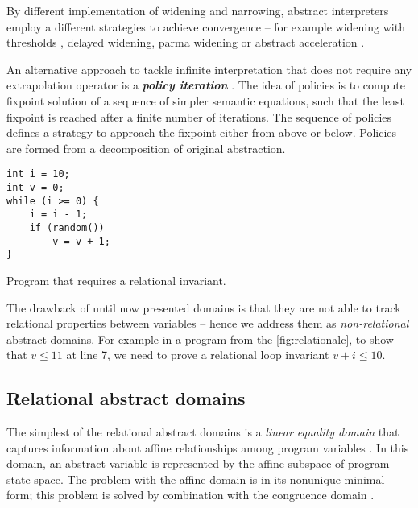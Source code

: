 By different implementation of widening and narrowing, abstract interpreters
employ a different strategies to achieve convergence -- for example widening
with thresholds \cite{Blanchet2003, Lakhdar2011}, delayed widening, parma widening
\cite{Bagnara2008} or abstract acceleration \cite{Gonnord2006, Feautrier2010}.

An alternative approach to tackle infinite interpretation that does not require
any extrapolation operator is a \textbf{\emph{policy iteration}}
\cite{Costan2005, Gaubert2007, Gawlitza2007, Gawlitza2007b, Gawlitza2011}. The
idea of policies is to compute fixpoint solution of a sequence of simpler
semantic equations, such that the least fixpoint is reached after a finite
number of iterations.  The sequence of policies defines a strategy to approach
the fixpoint either from above or below. Policies are formed from a
decomposition of original abstraction.

\begin{marginfigure}
\begin{verbatim}
int i = 10;
int v = 0;
while (i >= 0) {
    i = i - 1;
    if (random())
        v = v + 1;
}
\end{verbatim}
    \caption{Program that requires a relational invariant.}
    \label{fig:relationalc}
\end{marginfigure}

The drawback of until now presented domains is that they are not able to track
relational properties between variables -- hence we address them as
\emph{non-relational} abstract domains. For example in a program from the
\autoref{fig:relationalc}, to show that $v \leq 11$ at line 7, we need to
prove a relational loop invariant $v + i \leq 10$.


\subsection{Relational abstract domains}

The simplest of the relational abstract domains is a \emph{linear equality
domain} that captures information about affine relationships among program
variables \cite{Karr1976}. In this domain, an abstract variable is represented
by the affine subspace of program state space. The problem with the affine
domain is in its nonunique minimal form; this problem is solved by combination
with the congruence domain \cite{Granger1991}.

